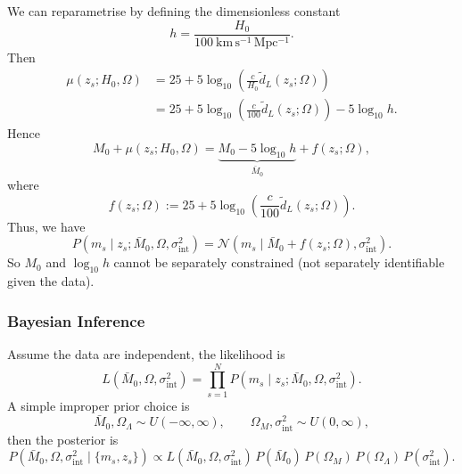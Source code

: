 \documentclass[11pt, titlepage]{article} %
\numberwithin{equation}{section}
\theoremstyle{definition}
\numberwithin{assumption}{section}
\begin{document}
We can reparametrise by defining the dimensionless constant
\begin{equation*}
    h=\frac{H_0}{100\ \mathrm{km\,s^{-1}\,Mpc^{-1}}}.
\end{equation*}
Then
\begin{align*}
    \mu(z_s;H_0,\Omega)
    &=
    25+5\log_{10}\!\left(\frac{c}{H_0}\tilde d_L(z_s;\Omega)\right)\\
    &=
    25+5\log_{10}\!\left(\frac{c}{100}\tilde d_L(z_s;\Omega)\right)-5\log_{10}h.
\end{align*}
Hence
\begin{equation*}
    M_0+\mu(z_s;H_0,\Omega)
    =
    \underbrace{M_0-5\log_{10}h}_{\bar M_0}
    +
    f(z_s;\Omega),
\end{equation*}
where
\begin{equation*}
    f(z_s;\Omega)
    :=
    25+5\log_{10}\!\left(\frac{c}{100}\tilde d_L(z_s;\Omega)\right).
\end{equation*}
Thus, we have
\begin{equation*}
    P(m_s\mid z_s;\bar M_0,\Omega,\sigma_{\mathrm{int}}^2)
    =
    \mathcal{N}\!\left(
    m_s \mid \bar M_0+f(z_s;\Omega),\sigma_{\mathrm{int}}^2
    \right).
\end{equation*}
So $M_0$ and $\log_{10}h$ cannot be separately constrained (not separately identifiable given the data).

\subsubsection*{Bayesian Inference}

Assume the data are independent, the likelihood is
\begin{equation*}
    L(\bar M_0,\Omega,\sigma_{\mathrm{int}}^2)
    =
    \prod_{s=1}^N
    P(m_s\mid z_s;\bar M_0,\Omega,\sigma_{\mathrm{int}}^2).
\end{equation*}
A simple improper prior choice is
\begin{equation*}
    \bar M_0,\Omega_\Lambda \sim U(-\infty,\infty),
    \qquad
    \Omega_M,\sigma_{\mathrm{int}}^2 \sim U(0,\infty),
\end{equation*}
then the posterior is
\begin{equation*}
    P(\bar M_0,\Omega,\sigma_{\mathrm{int}}^2\mid \{m_s,z_s\})
    \propto
    L(\bar M_0,\Omega,\sigma_{\mathrm{int}}^2)\,
    P(\bar M_0)\,P(\Omega_M)\,P(\Omega_\Lambda)\,P(\sigma_{\mathrm{int}}^2).
\end{equation*}
\end{document}
